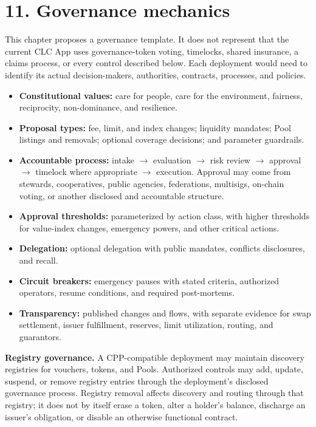 \documentclass[11pt]{article}
\begin{document}
\section*{11. Governance mechanics}

This chapter proposes a governance template. It does not represent that the current CLC App uses governance-token voting, timelocks, shared insurance, a claims process, or every control described below. Each deployment would need to identify its actual decision-makers, authorities, contracts, processes, and policies.

\begin{itemize}[leftmargin=*]
\item \textbf{Constitutional values:} care for people, care for the environment, fairness, reciprocity, non-dominance, and resilience.
\item \textbf{Proposal types:} fee, limit, and index changes; liquidity mandates; Pool listings and removals; optional coverage decisions; and parameter guardrails.
\item \textbf{Accountable process:} intake $\to$ evaluation $\to$ risk review $\to$ approval $\to$ timelock where appropriate $\to$ execution. Approval may come from stewards, cooperatives, public agencies, federations, multisigs, on-chain voting, or another disclosed and accountable structure.
\item \textbf{Approval thresholds:} parameterized by action class, with higher thresholds for value-index changes, emergency powers, and other critical actions.
\item \textbf{Delegation:} optional delegation with public mandates, conflicts disclosures, and recall.
\item \textbf{Circuit breakers:} emergency pauses with stated criteria, authorized operators, resume conditions, and required post-mortems.
\item \textbf{Transparency:} published changes and flows, with separate evidence for swap settlement, issuer fulfillment, reserves, limit utilization, routing, and guarantors.
\end{itemize}
\textbf{Registry governance.} A CPP-compatible deployment may maintain discovery registries for vouchers, tokens, and Pools. Authorized controls may add, update, suspend, or remove registry entries through the deployment's disclosed governance process. Registry removal affects discovery and routing through that registry; it does not by itself erase a token, alter a holder's balance, discharge an issuer's obligation, or disable an otherwise functional contract.
\end{document}
